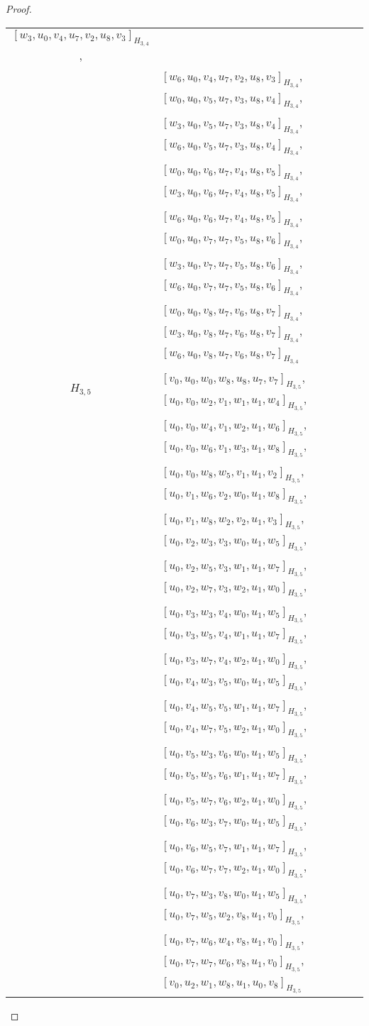 \begin{subappendices}
\begin{proof}
{\begin{longtable}{|c|l|}
  $[w_3, u_0, v_4, u_7, v_2, u_8, v_3]_{H_{3,4}}$, \\* &
  $[w_6, u_0, v_4, u_7, v_2, u_8, v_3]_{H_{3,4}}$,
  $[w_0, u_0, v_5, u_7, v_3, u_8, v_4]_{H_{3,4}}$, \\* &
  $[w_3, u_0, v_5, u_7, v_3, u_8, v_4]_{H_{3,4}}$,
  $[w_6, u_0, v_5, u_7, v_3, u_8, v_4]_{H_{3,4}}$, \\* &
  $[w_0, u_0, v_6, u_7, v_4, u_8, v_5]_{H_{3,4}}$,
  $[w_3, u_0, v_6, u_7, v_4, u_8, v_5]_{H_{3,4}}$, \\* &
  $[w_6, u_0, v_6, u_7, v_4, u_8, v_5]_{H_{3,4}}$,
  $[w_0, u_0, v_7, u_7, v_5, u_8, v_6]_{H_{3,4}}$, \\* &
  $[w_3, u_0, v_7, u_7, v_5, u_8, v_6]_{H_{3,4}}$,
  $[w_6, u_0, v_7, u_7, v_5, u_8, v_6]_{H_{3,4}}$, \\* &
  $[w_0, u_0, v_8, u_7, v_6, u_8, v_7]_{H_{3,4}}$,
  $[w_3, u_0, v_8, u_7, v_6, u_8, v_7]_{H_{3,4}}$, \\* &
  $[w_6, u_0, v_8, u_7, v_6, u_8, v_7]_{H_{3,4}}$
\\ \hline
$H_{3,5}$ &
  $[v_0, u_0, w_0, w_8, u_8, u_7, v_7]_{H_{3,5}}$,
  $[u_0, v_0, w_2, v_1, w_1, u_1, w_4]_{H_{3,5}}$, \\* &
  $[u_0, v_0, w_4, v_1, w_2, u_1, w_6]_{H_{3,5}}$,
  $[u_0, v_0, w_6, v_1, w_3, u_1, w_8]_{H_{3,5}}$, \\* &
  $[u_0, v_0, w_8, w_5, v_1, u_1, v_2]_{H_{3,5}}$,
  $[u_0, v_1, w_6, v_2, w_0, u_1, w_8]_{H_{3,5}}$, \\* &
  $[u_0, v_1, w_8, w_2, v_2, u_1, v_3]_{H_{3,5}}$,
  $[u_0, v_2, w_3, v_3, w_0, u_1, w_5]_{H_{3,5}}$, \\* &
  $[u_0, v_2, w_5, v_3, w_1, u_1, w_7]_{H_{3,5}}$,
  $[u_0, v_2, w_7, v_3, w_2, u_1, w_0]_{H_{3,5}}$, \\* &
  $[u_0, v_3, w_3, v_4, w_0, u_1, w_5]_{H_{3,5}}$,
  $[u_0, v_3, w_5, v_4, w_1, u_1, w_7]_{H_{3,5}}$, \\* &
  $[u_0, v_3, w_7, v_4, w_2, u_1, w_0]_{H_{3,5}}$,
  $[u_0, v_4, w_3, v_5, w_0, u_1, w_5]_{H_{3,5}}$, \\* &
  $[u_0, v_4, w_5, v_5, w_1, u_1, w_7]_{H_{3,5}}$,
  $[u_0, v_4, w_7, v_5, w_2, u_1, w_0]_{H_{3,5}}$, \\* &
  $[u_0, v_5, w_3, v_6, w_0, u_1, w_5]_{H_{3,5}}$,
  $[u_0, v_5, w_5, v_6, w_1, u_1, w_7]_{H_{3,5}}$, \\* &
  $[u_0, v_5, w_7, v_6, w_2, u_1, w_0]_{H_{3,5}}$,
  $[u_0, v_6, w_3, v_7, w_0, u_1, w_5]_{H_{3,5}}$, \\* &
  $[u_0, v_6, w_5, v_7, w_1, u_1, w_7]_{H_{3,5}}$,
  $[u_0, v_6, w_7, v_7, w_2, u_1, w_0]_{H_{3,5}}$, \\* &
  $[u_0, v_7, w_3, v_8, w_0, u_1, w_5]_{H_{3,5}}$,
  $[u_0, v_7, w_5, w_2, v_8, u_1, v_0]_{H_{3,5}}$, \\* &
  $[u_0, v_7, w_6, w_4, v_8, u_1, v_0]_{H_{3,5}}$,
  $[u_0, v_7, w_7, w_6, v_8, u_1, v_0]_{H_{3,5}}$, \\* &
  $[v_0, u_2, w_1, w_8, u_1, u_0, v_8]_{H_{3,5}}$
\\ \hline
\end{longtable}
}
\end{proof}


\end{subappendices}
